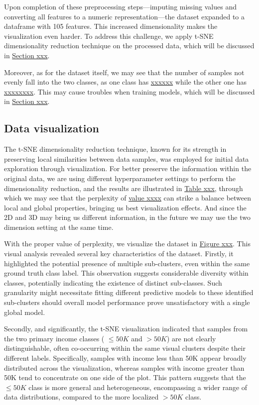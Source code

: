 \documentclass{article}
\begin{document}
Upon completion of these preprocessing steps—imputing missing values and converting all features to a numeric representation—the dataset expanded to a dataframe with 105 features. This increased dimensionality makes the visualization even harder. To address this challenge, we apply t-SNE dimensionality reduction technique on the processed data, which will be discussed in \underline{Section xxx}.

Moreover, as for the dataset itself, we may see that the number of samples not evenly fall into the two classes, as one class has \underline{xxxxxx} while the other one has \underline{xxxxxxxx}. This may cause troubles when training models, which will be discussed in \underline{Section xxx}.



\subsection{Data visualization}



The t-SNE dimensionality reduction technique, known for its strength in preserving local similarities between data samples, was employed for initial data exploration through visualization. For better preserve the information within the original data, we are using different hyperparameter settings to perform the dimensionality reduction, and the results are illustrated in \underline{Table xxx}, through which we may see that the perplexity of \underline{value xxxx} can strike a balance between local and global properties, bringing us best visualization effects. And since the 2D and 3D may bring us different information, in the future we may use the two dimension setting at the same time.

With the proper value of perplexity, we visualize the dataset in \underline{Figure xxx}. This visual analysis revealed several key characteristics of the dataset. Firstly, it highlighted the potential presence of multiple sub-clusters, even within the same ground truth class label. This observation suggests considerable diversity within classes, potentially indicating the existence of distinct sub-classes. Such granularity might necessitate fitting different predictive models to these identified sub-clusters should overall model performance prove unsatisfactory with a single global model.

Secondly, and significantly, the t-SNE visualization indicated that samples from the two primary income classes ( $\le50K$ and $>50K$) are not clearly distinguishable, often co-occurring within the same visual clusters despite their different labels. Specifically, samples with income less than 50K appear broadly distributed across the visualization, whereas samples with income greater than 50K tend to concentrate on one side of the plot. This pattern suggests that the $\le50K$ class is more general and heterogeneous, encompassing a wider range of data distributions, compared to the more localized $>50K$ class.
\end{document}
